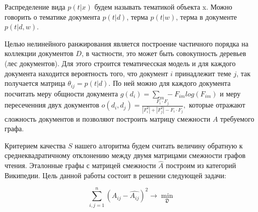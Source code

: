 \documentclass[12pt,twoside]{article}
\begin{document}
	Распределение вида $p(t|x)$ будем называть тематикой объекта x. Можно говорить о тематике документа $p(t|d)$, терма $p(t|w)$, терма в документе $p(t|d, w)$.
	
	Целью нелинейного ранжирования  является построение частичного порядка на коллекции документов $D$, в частности, это может быть совокупность деревьев (лес документов). Для этого строится тематичесская модель и для каждого документа находится вероятность того, что документ $i$ принадлежит теме $j$, так получается матрица $\theta_{ij}= p(t|d)$. По ней можно для каждого документа посчитать меру общности документа $g(d_i) = \sum\limits_{m} -F_{im}log(F_{im}) $ и меру пересеченния двух документов $o(d_i, d_j) = \frac{F_i\cdot F_j}{|F_i^2|+|F_j^2| - F_i\cdot F_j},$ которые отражают сложность документов и позволяют построить матрицу смежности $A$ требуемого графа.
	
	Критерием качества $S$ нашего алгоритма будем считать величину обратную к среднеквадратичному отклонению между двумя матрицами смежности графов чтения. Эталонные графы с матрицей смежности $\hat{A}$ построим из категорий Википедии. Цель данной работы состоит в решении следующей задачи:
	
	\begin{equation}
	\sum\limits_{i,j = 1}^n(A_{ij}-\hat{A_{ij}})^2\rightarrow \min_{\mathfrak{D}}
	\end{equation}
	
	
	
	
	
	
	
	
	
	
\end{document}

